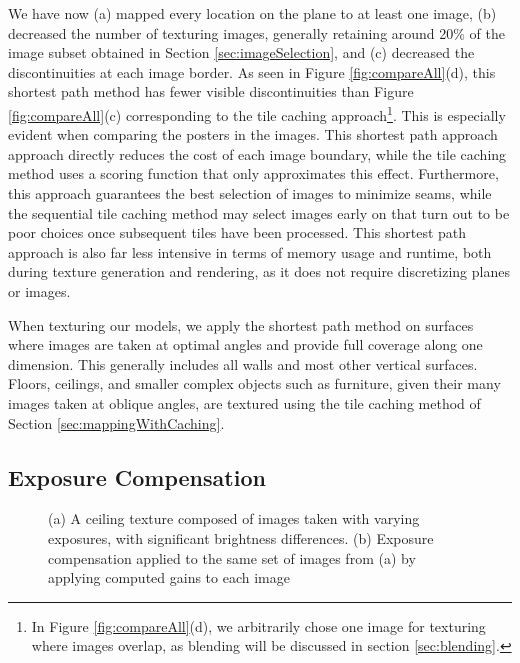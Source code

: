 \documentclass[]{spie}  %
\begin{document}
We have now (a) mapped every location on the plane to at least one
image, (b) decreased the number of texturing images, generally
retaining around 20\% of the image subset obtained in Section
\ref{sec:imageSelection}, and (c) decreased the discontinuities at
each image border. As seen in Figure \ref{fig:compareAll}(d), this
shortest path method has fewer visible discontinuities than Figure
\ref{fig:compareAll}(c) corresponding to the tile caching
approach\footnote{In Figure \ref{fig:compareAll}(d), we arbitrarily
  chose one image for texturing where images overlap, as blending will
  be discussed in section \ref{sec:blending}.}. This is especially
evident when comparing the posters in the images. This shortest path
approach approach directly reduces the cost of each image boundary,
while the tile caching method uses a scoring function that only
approximates this effect. Furthermore, this approach guarantees the
best selection of images to minimize seams, while the sequential tile
caching method may select images early on that turn out to be poor
choices once subsequent tiles have been processed. This shortest path
approach is also far less intensive in terms of memory usage and
runtime, both during texture generation and rendering, as it does not
require discretizing planes or images.

When texturing our models, we apply the shortest path method on
surfaces where images are taken at optimal angles and provide full
coverage along one dimension. This generally includes all walls and
most other vertical surfaces. Floors, ceilings, and smaller complex
objects such as furniture, given their many images taken at oblique
angles, are textured using the tile caching method of Section
\ref{sec:mappingWithCaching}.

\subsection{Exposure Compensation}
\label{sec:exposureCompensation}

\begin{figure}
  \centering
  \hspace{0.5in}
  \caption{(a) A ceiling texture composed of images taken with varying
    exposures, with significant brightness differences. (b) Exposure
    compensation applied to the same set of images from (a) by
    applying computed gains to each image}
  \label{fig:exposureDiff}
\end{figure}
\end{document}
